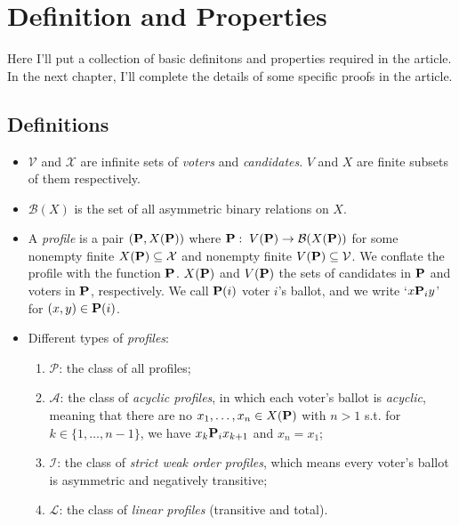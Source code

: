 \chapter{Definition and Properties}

Here I'll put a collection of basic definitons and properties required in the article. In the next chapter, I'll complete the details of some specific proofs in the article.

\section{Definitions}

\begin{definition}
    \begin{itemize}
        \item $\mathcal{V}$ and $\mathcal{X}$ are infinite sets of \emph{voters} and \emph{candidates}. $V$ and $X$ are finite subsets of them respectively.
        \item $\mathcal{B}(X)$ is the set of all asymmetric binary relations on $X$.
        \item A \emph{profile} is a pair $(\mathbf{P}, X(\mathbf{P}))$ where $\mathbf{P}:\; V(\mathbf{P}) \to \mathcal{B}(X(\mathbf{P}))$ for some nonempty finite $X(\mathbf{P}) \subseteq \mathcal{X}$ and nonempty finite $V (\mathbf{P}) \subseteq \mathcal{V}$. We conflate the profile with the function $\mathbf{P}$. $X(\mathbf{P})$ and $V (\mathbf{P})$ the sets of candidates in $\mathbf{P}$ and voters in $\mathbf{P}$, respectively. We call $\mathbf{P}(i)$ voter $i$'s ballot, and we write `$x\mathbf{P}_iy$' for $(x, y) \in \mathbf{P}(i)$.
        \item Different types of \emph{profiles}:
        \begin{enumerate}
            \item $\mathscr{P}$: the class of all profiles;
            \item $\mathscr{A}$: the class of \emph{acyclic profiles}, in which each voter's ballot is \emph{acyclic}, meaning that there are no $x_1, \dots, x_n \in X(\mathbf{P})$ with $n > 1$ s.t. for $k \in \{1,\dots,n-1\}$, we have $x_k \mathbf{P}_i x_{k+1}$ and $x_n = x_1$;
            \item $\mathscr{I}$: the class of \emph{strict weak order profiles}, which means every voter's ballot is asymmetric and negatively transitive;
            \item $\mathscr{L}$: the class of \emph{linear profiles} (transitive and total).
        \end{enumerate}

\end{itemize}
\end{definition}
